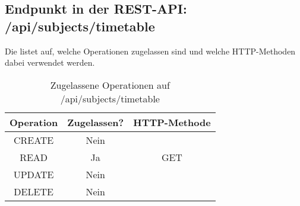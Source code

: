 \subsection{Endpunkt in der REST-API: /api/subjects/timetable}
Die  listet auf, welche Operationen zugelassen sind und welche HTTP-Methoden dabei verwendet werden. 

\begin{table}[!htbp]
	\begin{tabular}{|c|c|c|}
		\hline
			\textbf{Operation} & \textbf{Zugelassen?} & \textbf{HTTP-Methode} \\ \hline
			CREATE & Nein & \\ \hline 
			READ & Ja & GET \\ \hline
			UPDATE & Nein & \\ \hline 
			DELETE & Nein & \\ \hline
	\end{tabular}

		\caption{Zugelassene Operationen auf /api/subjects/timetable}
		\label{tab:end:rest:api:subjects:timetable:meth}
\end{table}

